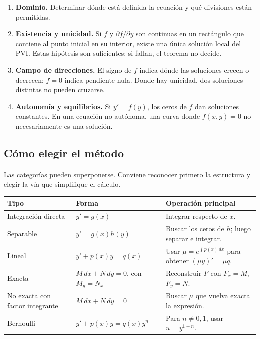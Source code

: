 \documentclass[12pt,a4paper]{article}
\begin{document}
	\begin{enumerate}[label=\arabic*.]
		\item \textbf{Dominio.} Determinar dónde está definida la ecuación y qué divisiones están permitidas.
		\item \textbf{Existencia y unicidad.} Si \(f\) y \(\partial f/\partial y\) son continuas en un rectángulo que contiene al punto inicial en su interior, existe una única solución local del PVI. Estas hipótesis son suficientes: si fallan, el teorema no decide.
		\item \textbf{Campo de direcciones.} El signo de \(f\) indica dónde las soluciones crecen o decrecen; \(f=0\) indica pendiente nula. Donde hay unicidad, dos soluciones distintas no pueden cruzarse.
		\item \textbf{Autonomía y equilibrios.} Si \(y'=f(y)\), los ceros de \(f\) dan soluciones constantes. En una ecuación no autónoma, una curva donde \(f(x,y)=0\) no necesariamente es una solución.
	\end{enumerate}

	\clearpage
	\subsection{Cómo elegir el método}

	Las categorías pueden superponerse. Conviene reconocer primero la estructura y elegir la vía que simplifique el cálculo.

	\begin{center}
	\renewcommand{\arraystretch}{1.3}
	\begin{tabularx}{\textwidth}{@{}p{}X X@{}}
	\toprule
	\textbf{Tipo} & \textbf{Forma} & \textbf{Operación principal} \\
	\midrule
	Integración directa & \(y'=g(x)\) & Integrar respecto de \(x\). \\
	Separable & \(y'=g(x)h(y)\) & Buscar los ceros de \(h\); luego separar e integrar. \\
	Lineal & \(y'+p(x)y=q(x)\) & Usar \(\mu=e^{\int p(x)\,dx}\) para obtener \((\mu y)'=\mu q\). \\
	Exacta & \(M\,dx+N\,dy=0\), con \(M_y=N_x\) & Reconstruir \(F\) con \(F_x=M\), \(F_y=N\). \\
	No exacta con factor integrante & \(M\,dx+N\,dy=0\) & Buscar \(\mu\) que vuelva exacta la expresión. \\
	Bernoulli & \(y'+p(x)y=q(x)y^n\) & Para \(n\neq0,1\), usar \(u=y^{1-n}\). \\
	\bottomrule
	\end{tabularx}
	\end{center}
\end{document}
